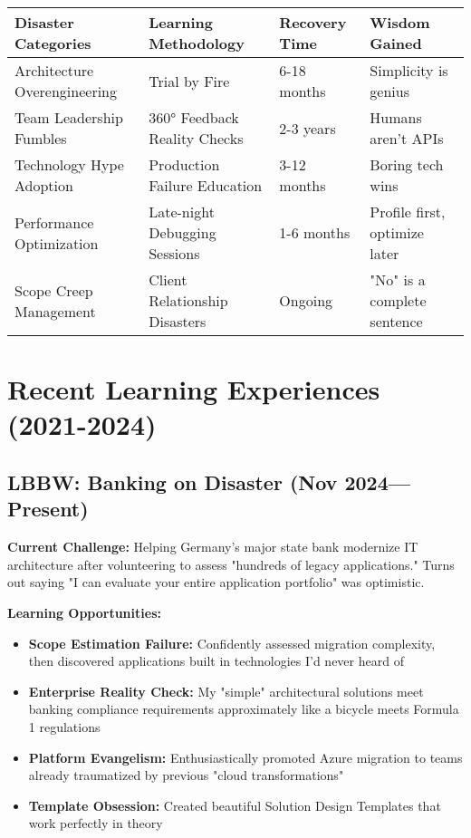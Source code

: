 \documentclass[10pt,a4paper]{article}
\begin{document}
\vspace{10pt}
\begin{tabularx}{\textwidth}{|X|X|X|X|}
\hline
\textbf{Disaster Categories} & \textbf{Learning Methodology} & \textbf{Recovery Time} & \textbf{Wisdom Gained} \\
\hline
Architecture Overengineering & Trial by Fire & 6-18 months & Simplicity is genius \\
\hline
Team Leadership Fumbles & 360° Feedback Reality Checks & 2-3 years & Humans aren't APIs \\
\hline
Technology Hype Adoption & Production Failure Education & 3-12 months & Boring tech wins \\
\hline
Performance Optimization & Late-night Debugging Sessions & 1-6 months & Profile first, optimize later \\
\hline
Scope Creep Management & Client Relationship Disasters & Ongoing & "No" is a complete sentence \\
\hline
\end{tabularx}

\section{Recent Learning Experiences (2021-2024)}

\subsection{LBBW: Banking on Disaster (Nov 2024—Present)}

\textbf{Current Challenge:} Helping Germany's major state bank modernize IT architecture after volunteering to assess "hundreds of legacy applications." Turns out saying "I can evaluate your entire application portfolio" was optimistic.

\textbf{Learning Opportunities:}
\begin{itemize}
\item \textbf{Scope Estimation Failure:} Confidently assessed migration complexity, then discovered applications built in technologies I'd never heard of
\item \textbf{Enterprise Reality Check:} My "simple" architectural solutions meet banking compliance requirements approximately like a bicycle meets Formula 1 regulations
\item \textbf{Platform Evangelism:} Enthusiastically promoted Azure migration to teams already traumatized by previous "cloud transformations"
\item \textbf{Template Obsession:} Created beautiful Solution Design Templates that work perfectly in theory
\end{itemize}
\end{document}
